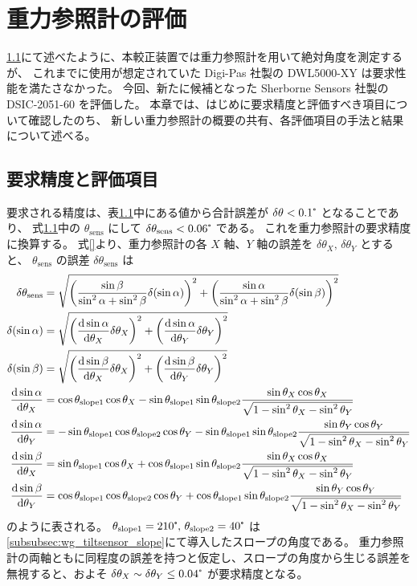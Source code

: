 \documentclass[../../main.tex]{subfiles}
\begin{document}
\chapter{重力参照計の評価}
\ref{}にて述べたように、本較正装置では重力参照計を用いて絶対角度を測定するが、
これまでに使用が想定されていた Digi-Pas 社製の DWL5000-XY は要求性能を満たさなかった。
今回、新たに候補となった Sherborne Sensors 社製の DSIC-2051-60 を評価した。
本章では、はじめに要求精度と評価すべき項目について確認したのち、
新しい重力参照計の概要の共有、各評価項目の手法と結果について述べる。
\section{要求精度と評価項目}
要求される精度は、表\ref{}中にある値から合計誤差が $\delta\theta < 0.1\tcdegree$ となることであり、
式\ref{}中の $\theta_{\mathrm{sens}}$ にして $\delta\theta_{\mathrm{sens}}<0.06\tcdegree$ である。
これを重力参照計の要求精度に換算する。
式\eqref{}より、重力参照計の各 $X$ 軸、$Y$ 軸の誤差を $\delta\theta_{X},\,\delta\theta_{Y}$ とすると、
$\theta_{\mathrm{sens}}$ の誤差 $\delta\theta_{\mathrm{sens}}$ は
\begin{align}
    \delta\theta_{\mathrm{sens}} &= 
        \sqrt{\qty(\dfrac{\sin\beta}{\sin^2\alpha+\sin^2\beta} \delta\qty(\sin\alpha))^2 + \qty(\dfrac{\sin\alpha}{\sin^2\alpha+\sin^2\beta} \delta\qty(\sin\beta))^2}\\ 
    \delta\qty(\sin\alpha) &= \sqrt{\qty(\dv{\sin\alpha}{\theta_X}\delta\theta_X)^2+\qty(\dv{\sin\alpha}{\theta_Y}\delta\theta_Y)^2}\\
    \delta\qty(\sin\beta) &= \sqrt{\qty(\dv{\sin\beta}{\theta_X}\delta\theta_X)^2+\qty(\dv{\sin\beta}{\theta_Y}\delta\theta_Y)^2} \\
    \dv{\sin\alpha}{\theta_X} &= \cos\theta_{\mathrm{slope}1}\cos\theta_X - \sin\theta_{\mathrm{slope}1}\sin\theta_{\mathrm{slope}2}\dfrac{\sin\theta_X\cos\theta_X}{\sqrt{1-\sin^2\theta_X-\sin^2\theta_Y}} \\
    \dv{\sin\alpha}{\theta_Y} &= -\sin\theta_{\mathrm{slope}1}\cos\theta_{\mathrm{slope}2}\cos\theta_Y - \sin\theta_{\mathrm{slope}1}\sin\theta_{\mathrm{slope}2}\dfrac{\sin\theta_Y\cos\theta_Y}{\sqrt{1-\sin^2\theta_X-\sin^2\theta_Y}} \\
    \dv{\sin\beta}{\theta_X} &= \sin\theta_{\mathrm{slope}1}\cos\theta_X + \cos\theta_{\mathrm{slope}1}\sin\theta_{\mathrm{slope}2}\dfrac{\sin\theta_X\cos\theta_X}{\sqrt{1-\sin^2\theta_X-\sin^2\theta_Y}} \\
    \dv{\sin\beta}{\theta_Y} &= \cos\theta_{\mathrm{slope}1}\cos\theta_{\mathrm{slope}2}\cos\theta_Y + \cos\theta_{\mathrm{slope}1}\sin\theta_{\mathrm{slope}2}\dfrac{\sin\theta_Y\cos\theta_Y}{\sqrt{1-\sin^2\theta_X-\sin^2\theta_Y}}
\end{align}
のように表される。
$\theta_{\mathrm{slope}1}=210\tcdegree,\,\theta_{\mathrm{slope}2}=40\tcdegree$ は\ref{subsubsec:wg_tiltsensor_slope}にて導入したスロープの角度である。
重力参照計の両軸ともに同程度の誤差を持つと仮定し、スロープの角度から生じる誤差を無視すると、およそ $\delta\theta_{X} \sim \delta\theta_{Y} \leq 0.04\tcdegree$ が要求精度となる。
\end{document}
